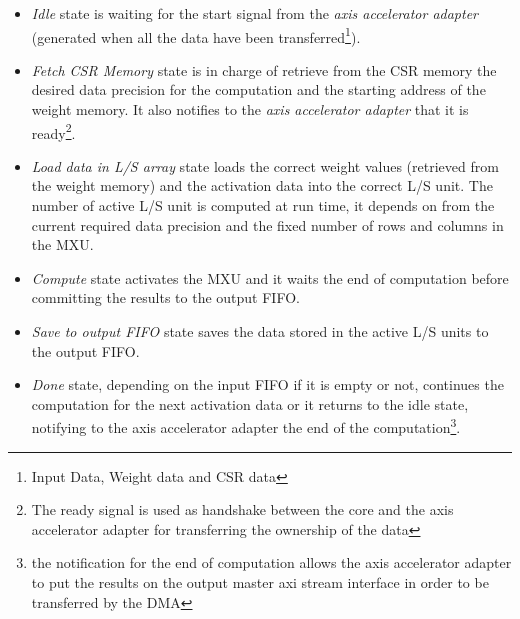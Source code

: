 \begin{itemize}
\item \textit{Idle} state is waiting for the start signal from the \textit{axis accelerator adapter} (generated when all the data have been transferred\footnote{Input Data, Weight data and CSR data}).
\item \textit{Fetch CSR Memory} state is in charge of retrieve from the CSR memory the desired data precision for the computation and the starting address of the weight memory. It also notifies to the \textit{axis accelerator adapter} that it is ready\footnote{The ready signal is used as handshake between the core and the axis accelerator adapter for transferring the ownership of the data}.
\item \textit{Load data in L/S array} state loads the correct weight values (retrieved from the weight memory) and the activation data into the correct L/S unit. The number of active L/S unit is computed at run time, it depends on from the current required data precision and the fixed number of rows and columns in the MXU.
\item \textit{Compute} state activates the MXU and it waits the end of computation before committing the results to the output FIFO.
\item \textit{Save to output FIFO} state saves the data stored in the active L/S units to the output FIFO.
\item \textit{Done} state, depending on the input FIFO if it is empty or not, continues the computation for the next activation data or it returns to the idle state, notifying to the axis accelerator adapter the end of the computation\footnote{the notification for the end of computation allows the axis accelerator adapter to put the results on the output master axi stream interface in order to be transferred by the DMA}.
\end{itemize}


